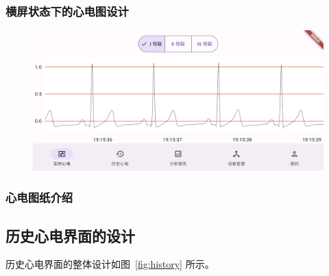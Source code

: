 
\subsubsection{横屏状态下的心电图设计}\label{subsubsec:real-time-landscape}


\begin{figure}[h]
    \includegraphics[width=\textwidth]{../assets/real-time-landscape}
    \label{fig:real-time-landscape}
\end{figure}

\subsubsection{心电图纸介绍}\label{subsubsec:ecg-paper}



\subsection{历史心电界面的设计}\label{subsec:history-design}

历史心电界面的整体设计如图~\ref{fig:history} 所示。

